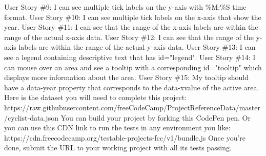 \documentclass{article}%
\begin{document}
User Story \#9: I can see multiple tick labels on the y{-}axis with \%M:\%S time format.\newline%
User Story \#10: I can see multiple tick labels on the x{-}axis that show the year.\newline%
User Story \#11: I can see that the range of the x{-}axis labels are within the range of the actual x{-}axis data.\newline%
User Story \#12: I can see that the range of the y{-}axis labels are within the range of the actual y{-}axis data.\newline%
User Story \#13: I can see a legend containing descriptive text that has id="legend".\newline%
User Story \#14: I can mouse over an area and see a tooltip with a corresponding id="tooltip" which displays more information about the area.\newline%
User Story \#15: My tooltip should have a data{-}year property that corresponds to the data{-}xvalue of the active area.\newline%
Here is the dataset you will need to complete this project: https://raw.githubusercontent.com/freeCodeCamp/ProjectReferenceData/master/cyclist{-}data.json\newline%
You can build your project by forking this CodePen pen. Or you can use this CDN link to run the tests in any environment you like: https://cdn.freecodecamp.org/testable{-}projects{-}fcc/v1/bundle.js\newline%
Once you're done, submit the URL to your working project with all its tests passing.\newline%

%
\end{document}
